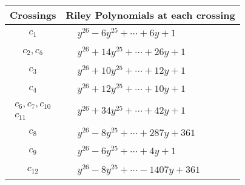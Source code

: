 \documentclass[1p]{elsarticle_modified}
\theoremstyle{definition}
\begin{document}
\begin{tabular}{m{50pt}|m{274pt}}
Crossings & \hspace{64pt}Riley Polynomials at each crossing \\
\hline $$\begin{aligned}c_{1}\end{aligned}$$&$\begin{aligned}
&y^{26}-6 y^{25}+\cdots+6 y+1
\end{aligned}$\\
\hline $$\begin{aligned}c_{2},c_{5}\end{aligned}$$&$\begin{aligned}
&y^{26}+14 y^{25}+\cdots+26 y+1
\end{aligned}$\\
\hline $$\begin{aligned}c_{3}\end{aligned}$$&$\begin{aligned}
&y^{26}+10 y^{25}+\cdots+12 y+1
\end{aligned}$\\
\hline $$\begin{aligned}c_{4}\end{aligned}$$&$\begin{aligned}
&y^{26}+12 y^{25}+\cdots+10 y+1
\end{aligned}$\\
\hline $$\begin{aligned}c_{6},c_{7},c_{10}\\c_{11}\end{aligned}$$&$\begin{aligned}
&y^{26}+34 y^{25}+\cdots+42 y+1
\end{aligned}$\\
\hline $$\begin{aligned}c_{8}\end{aligned}$$&$\begin{aligned}
&y^{26}-8 y^{25}+\cdots+287 y+361
\end{aligned}$\\
\hline $$\begin{aligned}c_{9}\end{aligned}$$&$\begin{aligned}
&y^{26}-6 y^{25}+\cdots+4 y+1
\end{aligned}$\\
\hline $$\begin{aligned}c_{12}\end{aligned}$$&$\begin{aligned}
&y^{26}-8 y^{25}+\cdots-1407 y+361
\end{aligned}$\\
\hline
\end{tabular}\\~\\
\end{document}
